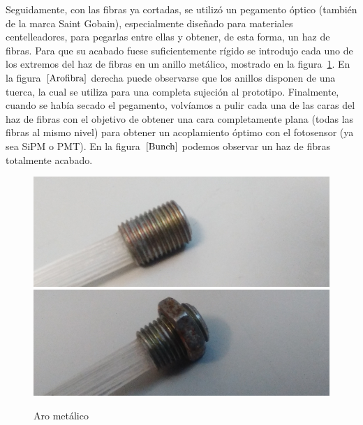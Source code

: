 Seguidamente, con las fibras ya cortadas, se utilizó un pegamento óptico (también de  la marca Saint Gobain), especialmente diseñado para materiales centelleadores, para pegarlas entre ellas y obtener, de esta forma, un haz de fibras. Para que su acabado fuese suficientemente rígido se introdujo cada uno de los extremos del haz de fibras en un anillo metálico, mostrado en la figura~\ref{Arofibra}. En la figura~$\ref{Arofibra}$ derecha puede observarse que los anillos disponen  de una tuerca, la cual se utiliza para una completa sujeción al prototipo.
Finalmente, cuando se había secado el pegamento, volvíamos a pulir cada una de las caras del haz de fibras con el objetivo de obtener una cara completamente plana (todas las fibras al mismo nivel) para obtener un  acoplamiento óptimo con el fotosensor (ya sea SiPM o PMT). En la figura~$\ref{Bunch}$ podemos observar un  haz de fibras totalmente acabado.


\begin{figure}[htb]
\centering
{
\includegraphics[scale=0.4]{arometalico.png} 
}
{
\includegraphics[scale=0.4]{arometalicoconrosca.png} 
}
\caption{Aro metálico\label{Arofibra}}
\end{figure} 




